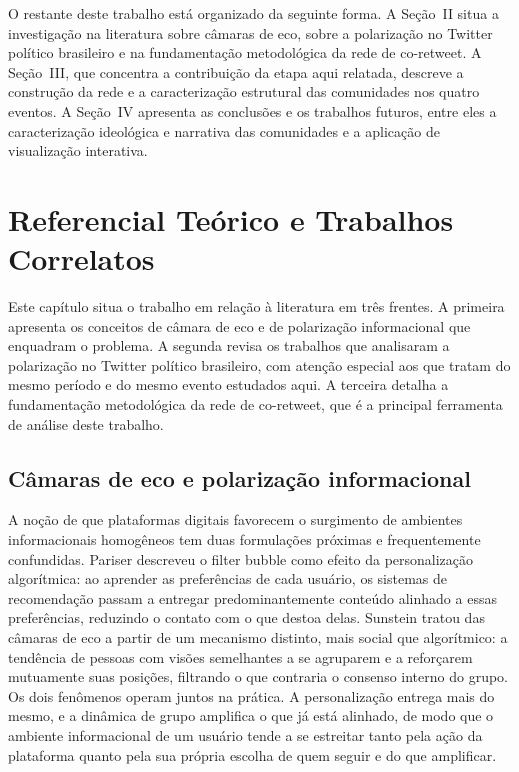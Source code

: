 \documentclass[conference]{IEEEtran}
\begin{document}
O restante deste trabalho está organizado da seguinte forma. A Seção~II situa a investigação na literatura sobre câmaras de eco, sobre a polarização no Twitter político brasileiro e na fundamentação metodológica da rede de co-retweet. A Seção~III, que concentra a contribuição da etapa aqui relatada, descreve a construção da rede e a caracterização estrutural das comunidades nos quatro eventos. A Seção~IV apresenta as conclusões e os trabalhos futuros, entre eles a caracterização ideológica e narrativa das comunidades e a aplicação de visualização interativa.

\section{Referencial Teórico e Trabalhos Correlatos}
Este capítulo situa o trabalho em relação à literatura em três frentes. A primeira apresenta os conceitos de câmara de eco e de polarização informacional que enquadram o problema. A segunda revisa os trabalhos que analisaram a polarização no Twitter político brasileiro, com atenção especial aos que tratam do mesmo período e do mesmo evento estudados aqui. A terceira detalha a fundamentação metodológica da rede de co-retweet, que é a principal ferramenta de análise deste trabalho.

\subsection{Câmaras de eco e polarização informacional}
A noção de que plataformas digitais favorecem o surgimento de ambientes informacionais homogêneos tem duas formulações próximas e frequentemente confundidas. Pariser \cite{b_pariser2011} descreveu o filter bubble como efeito da personalização algorítmica: ao aprender as preferências de cada usuário, os sistemas de recomendação passam a entregar predominantemente conteúdo alinhado a essas preferências, reduzindo o contato com o que destoa delas. Sunstein \cite{b_sunstein2001} tratou das câmaras de eco a partir de um mecanismo distinto, mais social que algorítmico: a tendência de pessoas com visões semelhantes a se agruparem e a reforçarem mutuamente suas posições, filtrando o que contraria o consenso interno do grupo. Os dois fenômenos operam juntos na prática. A personalização entrega mais do mesmo, e a dinâmica de grupo amplifica o que já está alinhado, de modo que o ambiente informacional de um usuário tende a se estreitar tanto pela ação da plataforma quanto pela sua própria escolha de quem seguir e do que amplificar.
\end{document}
